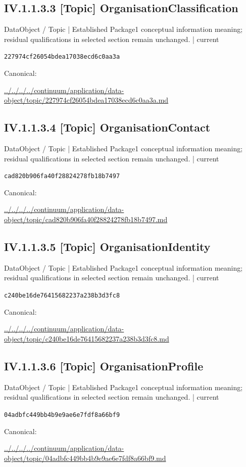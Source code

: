 \documentclass[10pt,a4paper]{article}
\begin{document}
\subsection*{IV.1.1.3.3 [Topic] OrganisationClassification}
{\small DataObject / Topic | Established Package1 conceptual information meaning; residual qualifications in selected section remain unchanged. | current}\par
\texttt{227974cf26054bdea17038ecd6c0aa3a}\par
Canonical: \par
{\footnotesize\url{../../../../continuum/application/data-object/topic/227974cf26054bdea17038ecd6c0aa3a.md}}\par
\subsection*{IV.1.1.3.4 [Topic] OrganisationContact}
{\small DataObject / Topic | Established Package1 conceptual information meaning; residual qualifications in selected section remain unchanged. | current}\par
\texttt{cad820b906fa40f28824278fb18b7497}\par
Canonical: \par
{\footnotesize\url{../../../../continuum/application/data-object/topic/cad820b906fa40f28824278fb18b7497.md}}\par
\subsection*{IV.1.1.3.5 [Topic] OrganisationIdentity}
{\small DataObject / Topic | Established Package1 conceptual information meaning; residual qualifications in selected section remain unchanged. | current}\par
\texttt{c240be16de76415682237a238b3d3fc8}\par
Canonical: \par
{\footnotesize\url{../../../../continuum/application/data-object/topic/c240be16de76415682237a238b3d3fc8.md}}\par
\subsection*{IV.1.1.3.6 [Topic] OrganisationProfile}
{\small DataObject / Topic | Established Package1 conceptual information meaning; residual qualifications in selected section remain unchanged. | current}\par
\texttt{04adbfc449bb4b9e9ae6e7fdf8a66bf9}\par
Canonical: \par
{\footnotesize\url{../../../../continuum/application/data-object/topic/04adbfc449bb4b9e9ae6e7fdf8a66bf9.md}}\par
\end{document}

